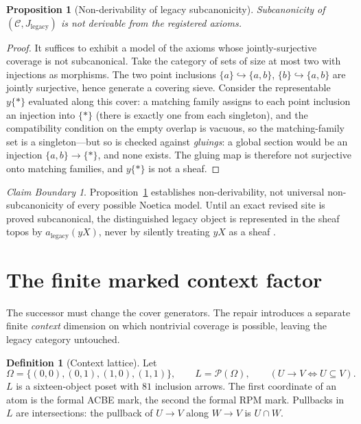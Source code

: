 \documentclass[11pt]{amsart}
\newtheorem{proposition}[theorem]{Proposition}
\theoremstyle{definition}
\newtheorem{definition}[theorem]{Definition}
\theoremstyle{remark}
\newtheorem{boundary}[theorem]{Claim Boundary}
\newcommand{\Noe}{\mathrm{Noetica}}
\newcommand{\Jleg}{J_{\mathrm{legacy}}}
\newcommand{\cC}{\mathcal{C}}
\begin{document}
\begin{proposition}[Non-derivability of legacy subcanonicity]\label{prop:countermodel}
Subcanonicity of $(\cC,\Jleg)$ is not derivable from the registered axioms.
\end{proposition}

\begin{proof}
It suffices to exhibit a model of the axioms whose jointly-surjective coverage is not subcanonical. Take the category of sets of size at most two with injections as morphisms. The two point inclusions $\{a\}\hookrightarrow\{a,b\}$, $\{b\}\hookrightarrow\{a,b\}$ are jointly surjective, hence generate a covering sieve. Consider the representable $y\{*\}$ evaluated along this cover: a matching family assigns to each point inclusion an injection into $\{*\}$ (there is exactly one from each singleton), and the compatibility condition on the empty overlap is vacuous, so the matching-family set is a singleton---but so is checked against \emph{gluings}: a global section would be an injection $\{a,b\}\to\{*\}$, and none exists. The gluing map is therefore not surjective onto matching families, and $y\{*\}$ is not a sheaf.
\end{proof}

\begin{boundary}
Proposition~\ref{prop:countermodel} establishes non-derivability, not universal non-subcanonicity of every possible $\Noe$ model. Until an exact revised site is proved subcanonical, the distinguished legacy object is represented in the sheaf topos by $a_{\mathrm{legacy}}(yX)$, never by silently treating $yX$ as a sheaf \cite{stacks00WO}.
\end{boundary}

\section{The finite marked context factor}\label{sec:factor}

The successor must change the cover generators. The repair introduces a separate finite \emph{context} dimension on which nontrivial coverage is possible, leaving the legacy category untouched.

\begin{definition}[Context lattice]\label{def:lattice}
Let
\[
\Omega=\{(0,0),(0,1),(1,0),(1,1)\},\qquad L=\mathcal{P}(\Omega),\qquad (U\to V \iff U\subseteq V).
\]
$L$ is a sixteen-object poset with $81$ inclusion arrows. The first coordinate of an atom is the formal ACBE mark, the second the formal RPM mark. Pullbacks in $L$ are intersections: the pullback of $U\to V$ along $W\to V$ is $U\cap W$.
\end{definition}
\end{document}
